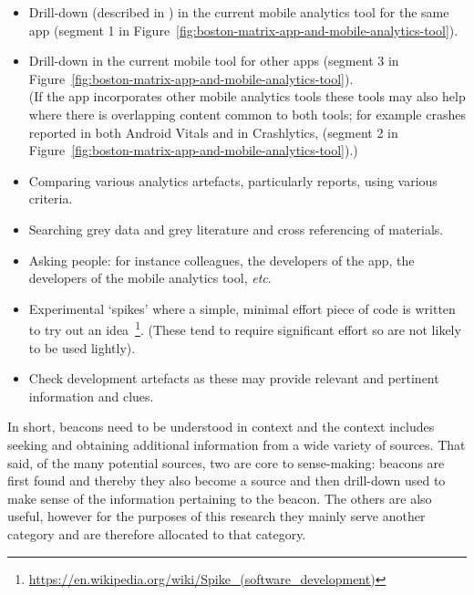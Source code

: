 \begin{itemize}
\itemsep0em
    \item Drill-down (described in ) in the current mobile analytics tool for the same app (segment 1 in Figure~\ref{fig:boston-matrix-app-and-mobile-analytics-tool}).
    \item Drill-down in the current mobile tool for other apps (segment 3 in Figure~\ref{fig:boston-matrix-app-and-mobile-analytics-tool}). \\ (If the app incorporates other mobile analytics tools these tools may also help where there is overlapping content common to both tools; for example crashes reported in both Android Vitals and in Crashlytics, (segment 2 in Figure~\ref{fig:boston-matrix-app-and-mobile-analytics-tool}).)
    \item Comparing various analytics artefacts, particularly reports, using various criteria.
    \item Searching grey data and grey literature and cross referencing of materials.
    \item Asking people: for instance colleagues, the developers of the app, the developers of the mobile analytics tool, \textit{etc}.
    \item Experimental `spikes' where a simple,  minimal effort piece of code is written to try out an idea~\footnote{\url{https://en.wikipedia.org/wiki/Spike_(software_development)}}. (These tend to require significant effort so are not likely to be used lightly).
    \item Check development artefacts as these may provide relevant and pertinent information and clues.
\end{itemize}

In short, beacons need to be understood in context and the context includes seeking and obtaining additional information from a wide variety of sources. That said, of the many potential sources, two are core to sense-making: beacons are first found and thereby they also become a source and then drill-down used to make sense of the information pertaining to the beacon. The others are also useful, however for the purposes of this research they mainly serve another category and are therefore allocated to that category.


